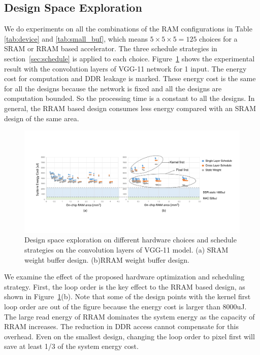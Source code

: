 \subsection{Design Space Exploration}
We do experiments on all the combinations of the RAM configurations in Table \ref{tab:device} and \ref{tab:small_buf}, which means $5\times 5\times 5 = 125$ choices for a SRAM or RRAM based accelerator. The three schedule strategies in section~\ref{sec:schedule} is applied to each choice. Figure~\ref{fig:design_space} shows the experimental result with the convolution layers of VGG-11 network for 1 input. The energy cost for computation and DDR leakage is marked. These energy cost is the same for all the designs because the network is fixed and all the designs are computation bounded. So the processing time is a constant to all the designs. In general, the RRAM based design consumes less energy compared with an SRAM design of the same area.

\begin{figure}[t]
  \centering
  \includegraphics[width=2\columnwidth]{fig/design_space.pdf}
  \caption{Design space exploration on different hardware choices and schedule strategies on the convolution layers of VGG-11 model. (a) SRAM weight buffer design. (b)RRAM weight buffer design.}
  \label{fig:design_space}
\end{figure}

We examine the effect of the proposed hardware optimization and scheduling strategy. First, the loop order is the key effect to the RRAM based design, as shown in Figure~\ref{fig:design_space}(b). Note that some of the design points with the kernel first loop order are out of the figure because the energy cost is larger than 8000uJ. The large read energy of RRAM dominates the system energy as the capacity of RRAM increases. The reduction in DDR access cannot compensate for this overhead. Even on the smallest design, changing the loop order to pixel first will save at least 1/3 of the system energy cost. 

